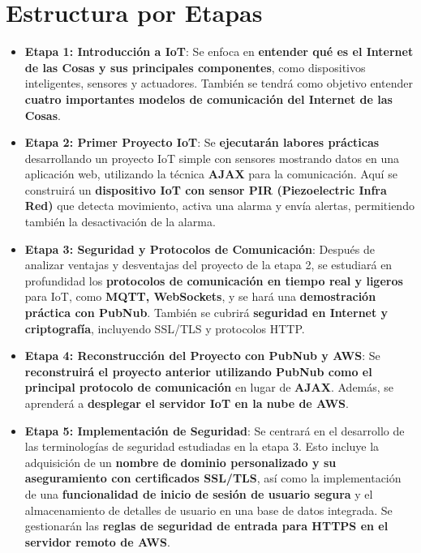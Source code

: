 \documentclass{report}
\begin{document}
\newpage
\section{Estructura por Etapas}
    \begin{itemize}
        \item \textbf{Etapa 1: Introducción a IoT}: Se enfoca en \textbf{entender qué es el Internet de las Cosas y sus principales componentes}, como 
              dispositivos inteligentes, sensores y actuadores. También se tendrá como objetivo entender \textbf{cuatro importantes modelos de 
              comunicación del Internet de las Cosas}.
        \item \textbf{Etapa 2: Primer Proyecto IoT}: Se \textbf{ejecutarán labores prácticas} desarrollando un proyecto IoT simple con sensores
              mostrando datos en una aplicación web, utilizando la técnica \textbf{AJAX} para la comunicación. Aquí se construirá un 
              \textbf{dispositivo IoT con sensor PIR (Piezoelectric Infra Red)} que detecta movimiento, activa una alarma y envía alertas, 
              permitiendo también la desactivación de la alarma.
        \item \textbf{Etapa 3: Seguridad y Protocolos de Comunicación}: Después de analizar ventajas y desventajas del proyecto de la etapa 2, se 
              estudiará en profundidad los \textbf{protocolos de comunicación en tiempo real y ligeros} para IoT, como \textbf{MQTT, WebSockets}, y se hará
              una \textbf{demostración práctica con PubNub}. También se cubrirá \textbf{seguridad en Internet y criptografía}, incluyendo SSL/TLS y 
              protocolos HTTP.
        \item \textbf{Etapa 4: Reconstrucción del Proyecto con PubNub y AWS}: Se \textbf{reconstruirá el proyecto anterior utilizando PubNub como el 
              principal protocolo de comunicación} en lugar de \textbf{AJAX}. Además, se aprenderá a \textbf{desplegar el servidor IoT en la nube de AWS}.
        \item \textbf{Etapa 5: Implementación de Seguridad}: Se centrará en el desarrollo de las terminologías de seguridad estudiadas en la etapa 3. 
              Esto incluye la adquisición de un \textbf{nombre de dominio personalizado y su aseguramiento con certificados SSL/TLS}, 
              así como la implementación de una \textbf{funcionalidad de inicio de sesión de usuario segura} y el almacenamiento de detalles de usuario 
              en una base de datos integrada. Se gestionarán las \textbf{reglas de seguridad de entrada para HTTPS en el servidor remoto de AWS}.

\end{itemize}
\end{document}
